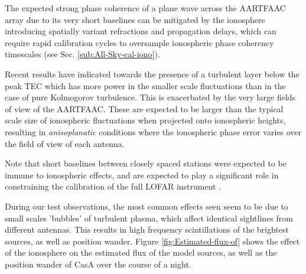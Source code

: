 \documentclass{aa}
\begin{document}
The expected  strong phase coherence of  a plane wave across  the AARTFAAC array
due to its  very short baselines can be mitigated  by the ionosphere introducing
spatially variant  refractions and propagation  delays, which can  require rapid
calibration  cycles to  oversample ionospheric  phase coherency  timescales (see
Sec. \ref{sub:All-Sky-cal-iono}).

Recent results \citep{intema2009ionospheric} have indicated towards the presence
of a  turbulent layer below  the peak  TEC which has  more power in  the smaller
scale  fluctuations than in  the case  of pure  Kolmogorov turbulence.   This is
exacerbated by the very large fields  of view of the \mbox{AARTFAAC}.  These are
expected to  be larger than the  typical scale size  of ionospheric fluctuations
when  projected  onto  ionospheric  heights,  resulting  in  \emph{anisoplanatic
}conditions where the  ionospheric phase error varies over the  field of view of
each antenna.

Note that  short baselines between closely  spaced stations were  expected to be
immune to  ionospheric effects, and are  expected to play a  significant role in
constraining    the     calibration    of    the     full    LOFAR    instrument
\citep{vdTol2007selfcallofar}.

During our  test observations, the  most common effects  seen seem to be  due to
small scales  'bubbles' of turbulent  plasma, which affect  identical sightlines
from different antennas.   This results in high frequency  scintillations of the
brightest     sources,     as    well     as     position    wander.      Figure
\ref{fig:Estimated-flux-of} shows the effect  of the ionosphere on the estimated
flux of  the model  sources, as  well as the  position wander  of CasA  over the
course of a night.
\end{document}
